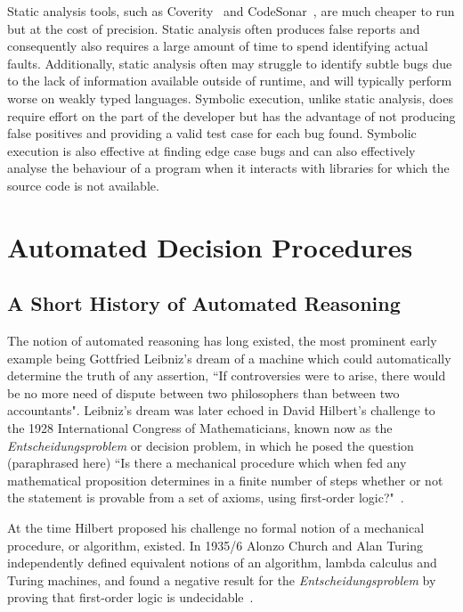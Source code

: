 \documentclass[]{final_report}
\begin{document}
Static analysis tools, such as Coverity~\cite{almossawi2006analysis,Bessey:2010:FBL:1646353.1646374} and CodeSonar~\cite{jetley2008static}, are much cheaper to run but at the cost of precision. Static analysis often produces false reports and consequently also requires a large amount of time to spend identifying actual faults. Additionally, static analysis often may struggle to identify subtle bugs due to the lack of information available outside of runtime, and will typically perform worse on weakly typed languages. Symbolic execution, unlike static analysis, does require effort on the part of the developer but has the advantage of not producing false positives and providing a valid test case for each bug found. Symbolic execution is also effective at finding edge case bugs and can also effectively analyse the behaviour of a program when it interacts with libraries for which the source code is not available.

\chapter{Automated Decision Procedures}

\section{A Short History of Automated Reasoning}
The notion of automated reasoning has long existed, the most prominent early example being Gottfried Leibniz's dream of a machine which could automatically determine the truth of any assertion, ``If controversies were to arise, there would be no more need of dispute between two philosophers than between two accountants". Leibniz's dream was later echoed in David Hilbert's challenge to the 1928 International Congress of Mathematicians, known now as the \textit{Entscheidungsproblem} or decision problem, in which he posed the question (paraphrased here) ``Is there a mechanical procedure which when fed any mathematical proposition determines in a finite number of steps whether or not the statement is provable from a set of axioms, using first-order logic?"~\cite{smtwheredowegofromhere, automatedreasoningbooklet2004}.

At the time Hilbert proposed his challenge no formal notion of a mechanical procedure, or algorithm, existed. In 1935/6 Alonzo Church and Alan Turing independently defined equivalent notions of an algorithm, lambda calculus and Turing machines, and found a negative result for the \textit{Entscheidungsproblem} by proving that first-order logic is undecidable~\cite{turingchurchproof}.
\end{document}
